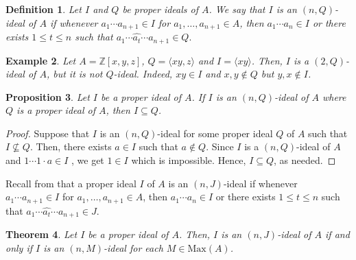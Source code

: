 \documentclass[10pt,a4paper]{amsart}
\newtheorem{theorem}{Theorem}[section]
\newtheorem{definition}[theorem]{Definition}
\newtheorem{example}[theorem]{Example}
\newtheorem{proposition}[theorem]{Proposition}
\numberwithin{equation}{section}
\begin{document}
\begin{definition}
Let $I$ and $ Q$  be proper ideals of $A$. We say that $I$ is  an  $(n,Q)$-ideal of $A$ if whenever $a_1\cdots a_{n+1} \in I  $ for $a_1,\ldots,a_{n+1} \in A$, then $a_1\cdots  a_n \in I$ or there exists $1 \leq t \leq n$ such that $a_1\cdots \widehat{a_t} \cdots a_{n+1} \in Q.$
\end{definition}
\begin{example}
Let $A=\mathbb{Z}[x,y,z]$, $Q=\langle xy,z  \rangle$ and  $I=\langle xy \rangle$. Then, $I$  is a $(2,Q)$-ideal of $A$, but it is not $Q$-ideal. Indeed, $x  y \in I$ and $x,y \notin Q$ but  $y,x \notin I$.
\end{example}
\begin{proposition} \label{1}
Let $I $   be a proper ideal of $A$. If $I$ is an  $(n,Q)$-ideal of $A$ where $Q$ is a proper ideal of $A$, then $I   \subseteq Q$.
\end{proposition}
\begin{proof}
Suppose that $I$ is an $(n,Q)$-ideal for some proper ideal $Q$ of $A$  such that  $I    \nsubseteq Q$. Then, there exists $a \in I$ such that $a \notin Q$. Since $I$ is a  $(n,Q)$-ideal of $A$ and $1 \cdots 1\cdot  a\in I$ , we get $1  \in I$ which is impossible. Hence, $I \subseteq Q$, as needed.
\end{proof}
Recall from \cite{Khalfi} that a proper ideal $I$ of $A$ is an  $(n,J)$-ideal if whenever $a_1\cdots a_{n+1} \in I  $ for $a_1,\ldots,a_{n+1} \in A$, then $a_1\cdots  a_n \in I$ or there exists $1 \leq t \leq n$ such that $a_1\cdots \widehat{a_t} \cdots a_{n+1} \in J.$ 
\begin{theorem}\label{2}
Let $I$ be a proper ideal of $A$. Then, $I$ is an $(n,J)$-ideal of $A$ if and only if $I$ is an $(n,M)$-ideal for each  $M \in \text{Max}(A)$.
\end{theorem}
\end{document}
